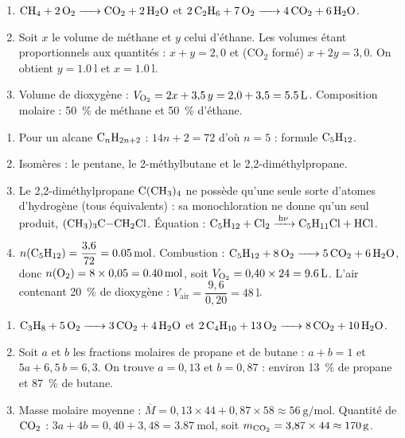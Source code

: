 \begin{enumerate}[label=\arabic*)]
\item $\ce{CH4 + 2 O2 -> CO2 + 2 H2O}$ \quad et \quad $\ce{2 C2H6 + 7 O2 -> 4 CO2 + 6 H2O}$.
\item Soit $x$ le volume de méthane et $y$ celui d'éthane. Les volumes étant
proportionnels aux quantités : $x + y = 2{,}0$ et (CO$_2$ formé) $x + 2y = 3{,}0$.
On obtient $y = \SI{1.0}{\litre}$ et $x = \SI{1.0}{\litre}$.
\item Volume de dioxygène : $V_{\ce{O2}} = 2x + 3{,}5\,y = 2{,}0 + 3{,}5 = \SI{5.5}{\litre}$.
Composition molaire : \SI{50}{\percent} de méthane et \SI{50}{\percent} d'éthane.
\end{enumerate}

\begin{enumerate}[label=\arabic*)]
\item Pour un alcane $\ce{C_nH_{2n+2}}$ : $14n + 2 = 72$ d'où $n = 5$ : formule $\ce{C5H12}$.
\item Isomères : le pentane, le 2-méthylbutane et le 2,2-diméthylpropane.
\item Le 2,2-diméthylpropane $\ce{C(CH3)4}$ ne possède qu'une seule sorte d'atomes
d'hydrogène (tous équivalents) : sa monochloration ne donne qu'un seul produit,
$\ce{(CH3)3C-CH2Cl}$. Équation : $\ce{C5H12 + Cl2 ->[h\nu] C5H11Cl + HCl}$.
\item $n(\ce{C5H12}) = \dfrac{3{,}6}{72} = \SI{0.05}{\mol}$. Combustion :
$\ce{C5H12 + 8 O2 -> 5 CO2 + 6 H2O}$, donc $n(\ce{O2}) = 8\times0{,}05 = \SI{0.40}{\mol}$,
soit $V_{\ce{O2}} = 0{,}40\times24 = \SI{9.6}{\litre}$. L'air contenant \SI{20}{\percent}
de dioxygène : $V_{\text{air}} = \dfrac{9{,}6}{0{,}20} = \SI{48}{\litre}$.
\end{enumerate}

\begin{enumerate}[label=\arabic*)]
\item $\ce{C3H8 + 5 O2 -> 3 CO2 + 4 H2O}$ \quad et \quad $\ce{2 C4H10 + 13 O2 -> 8 CO2 + 10 H2O}$.
\item Soit $a$ et $b$ les fractions molaires de propane et de butane : $a + b = 1$ et
$5a + 6{,}5\,b = 6{,}3$. On trouve $a = 0{,}13$ et $b = 0{,}87$ : environ
\SI{13}{\percent} de propane et \SI{87}{\percent} de butane.
\item Masse molaire moyenne : $\overline{M} = 0{,}13\times44 + 0{,}87\times58 \approx \SI{56}{\gram\per\mol}$.
Quantité de $\ce{CO2}$ : $3a + 4b = 0{,}40 + 3{,}48 = \SI{3.87}{\mol}$, soit
$m_{\ce{CO2}} = 3{,}87\times44 \approx \SI{170}{\gram}$.
\end{enumerate}

